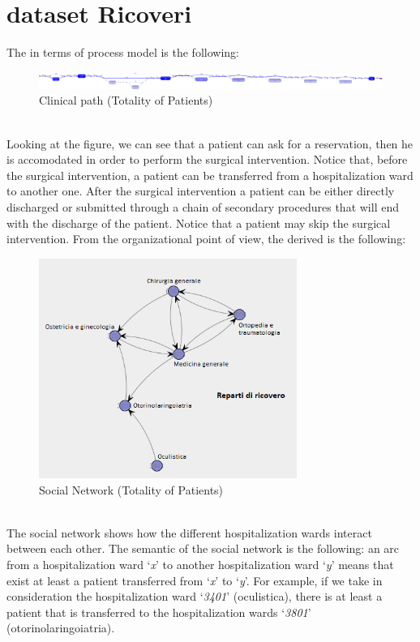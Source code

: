 \section{dataset Ricoveri}\label{analysis:3}
The  in terms of process model is the following:
\begin{figure} [htbp]
\includegraphics[width=\textwidth]{RicoveriProcessModel2}
\caption{Clinical path (Totality of Patients)}
\end{figure}\\
Looking at the figure, we can see that a patient can ask for a reservation, then he is accomodated in order to perform the surgical intervention. Notice that, before the surgical intervention, a patient can be transferred from a hospitalization ward to another one. After the surgical intervention a patient can be either directly discharged or submitted through a chain of secondary procedures that will end with the discharge of the patient. Notice that a patient may skip the surgical intervention. From the organizational point of view, the derived  is the following:
\begin{figure} [htbp]
\includegraphics[width=0.75\textwidth]{RicoveriSocialNetwork}
\caption{Social Network (Totality of Patients)}
\end{figure}\\
The social network shows how the different hospitalization wards interact between each other. The semantic of the social network is the following: an arc from a hospitalization ward `\textit{x}' to another hospitalization ward `\textit{y}' means that exist at least a patient transferred from `\textit{x}' to `\textit{y}'. For example, if we take in consideration the hospitalization ward `\textit{3401}' (oculistica), there is at least a patient that is transferred to the hospitalization wards `\textit{3801}' (otorinolaringoiatria).
